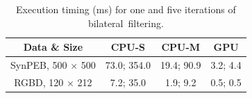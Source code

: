 
\begin{table}[H]
\centering
\caption{Execution timing (ms) for one and five iterations of bilateral~filtering.}\label{table:ch3_results_bilateral}
\begin{tabular}{@{}cccc@{}}
\toprule
\textbf{Data \& Size}    & \textbf{CPU-S}       & \textbf{CPU-M}           & \textbf{GPU}      \\ \midrule
SynPEB, 500 $\times$ 500 & 73.0; 354.0 & 19.4; 90.9      & 3.2; 4.4 \\
RGBD, 120 $\times$ 212   & 7.2; 35.0   & 1.9; 9.2        & 0.5; 0.5 \\ \bottomrule
\end{tabular}
\end{table}
\unskip



